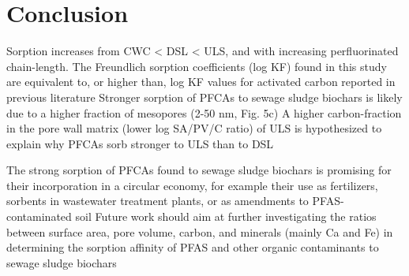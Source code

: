 \chapter{Conclusion}\label{chap:Conclusion}

Sorption increases from CWC < DSL < ULS, and with increasing perfluorinated chain-length. The Freundlich sorption coefficients (log KF) found in this study are equivalent to, or higher than, log KF  values for activated carbon reported in previous literature
Stronger sorption of PFCAs to sewage sludge biochars is likely due to a higher fraction of mesopores (2-50 nm, Fig. 5c)
A higher carbon-fraction in the pore wall matrix (lower log SA/PV/C ratio) of ULS is hypothesized to explain why PFCAs sorb stronger to ULS than to DSL 

The strong sorption of PFCAs found to sewage sludge biochars is promising for their incorporation in a circular economy, for example their use as fertilizers, sorbents in wastewater treatment plants, or as amendments to PFAS-contaminated soil
Future work should aim at further investigating the ratios between surface area, pore volume, carbon, and minerals (mainly Ca and Fe) in determining the sorption affinity of PFAS and other organic contaminants to sewage sludge biochars





